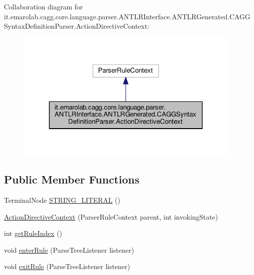 Collaboration diagram for it.\-emarolab.\-cagg.\-core.\-language.\-parser.\-A\-N\-T\-L\-R\-Interface.\-A\-N\-T\-L\-R\-Generated.\-C\-A\-G\-G\-Syntax\-Definition\-Parser.\-Action\-Directive\-Context\-:
\nopagebreak
\begin{figure}[H]
\begin{center}
\leavevmode
\includegraphics[width=310pt]{classit_1_1emarolab_1_1cagg_1_1core_1_1language_1_1parser_1_1ANTLRInterface_1_1ANTLRGenerated_1_5701d97fe4d275334609f3af34582384}
\end{center}
\end{figure}
\subsection*{Public Member Functions}
\begin{DoxyCompactItemize}
\item 
Terminal\-Node \hyperlink{classit_1_1emarolab_1_1cagg_1_1core_1_1language_1_1parser_1_1ANTLRInterface_1_1ANTLRGenerated_1_02518070e6ba2b505060c86c83a44fb1_a0f6a638f8f9b96d57f982253b8318d39}{S\-T\-R\-I\-N\-G\-\_\-\-L\-I\-T\-E\-R\-A\-L} ()
\item 
\hyperlink{classit_1_1emarolab_1_1cagg_1_1core_1_1language_1_1parser_1_1ANTLRInterface_1_1ANTLRGenerated_1_02518070e6ba2b505060c86c83a44fb1_ad1e70c763d7f04f1a9e5c913adc56d3f}{Action\-Directive\-Context} (Parser\-Rule\-Context parent, int invoking\-State)
\item 
int \hyperlink{classit_1_1emarolab_1_1cagg_1_1core_1_1language_1_1parser_1_1ANTLRInterface_1_1ANTLRGenerated_1_02518070e6ba2b505060c86c83a44fb1_a15558a380fe9d0df4ca41b93b0f20659}{get\-Rule\-Index} ()
\item 
void \hyperlink{classit_1_1emarolab_1_1cagg_1_1core_1_1language_1_1parser_1_1ANTLRInterface_1_1ANTLRGenerated_1_02518070e6ba2b505060c86c83a44fb1_a487ac4691a51305bb047097a88d62e17}{enter\-Rule} (Parse\-Tree\-Listener listener)
\item 
void \hyperlink{classit_1_1emarolab_1_1cagg_1_1core_1_1language_1_1parser_1_1ANTLRInterface_1_1ANTLRGenerated_1_02518070e6ba2b505060c86c83a44fb1_a67952eed48da17471b061ac311f3bf1b}{exit\-Rule} (Parse\-Tree\-Listener listener)
\end{DoxyCompactItemize}


